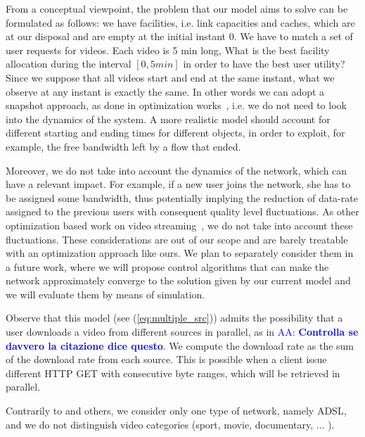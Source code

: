 \documentclass[10pt, journal,letterpaper]{IEEEtran}
\newcommand{\AAra}[1]{\textcolor{blue}{AA: \bf #1}}
\newcommand{\eqR}[1]{(\ref{eq:#1})}
\begin{document}
From a conceptual viewpoint, the problem that our model aims to solve can be formulated as follows: we have facilities, i.e. link capacities and caches, which are at our disposal and are empty at the initial instant $0$. We have to match a set of user requests for videos. Each video is 5 min long, What is the best facility allocation during the interval $[0,5 min]$ in order to have the best user utility? Since we suppose that all videos start and end at the same instant, what we observe at any instant is exactly the same. In other words we can adopt a snapshot approach, as done in optimization works~\cite{Toni2014,Zhang2013}, i.e. we do not need to look into the dynamics of the system. A more realistic model should account for different starting and ending times for different objects, in order to exploit, for example, the free bandwidth left by a flow that ended.

Moreover, we do not take into account the dynamics of the network, which can have a relevant impact. For example, if a new user joins the network, she has to be assigned some bandwidth, thus potentially implying the reduction of data-rate assigned to the previous users with consequent quality level fluctuations. As other optimization based work on video streaming~\cite{Toni2014}, we do not take into account these fluctuations. These considerations are out of our scope and are barely treatable with an optimization approach like ours. We plan to separately consider them in a future work, where we will propose control algorithms that can make the network approximately converge to the solution given by our current model and we will evaluate them by means of simulation.

Observe that this model (see \eqR{multiple_src}) admits the possibility that a user downloads a video from different sources in parallel, as in \cite{Liu2012b} \AAra{Controlla se davvero la citazione dice questo}. We compute the download rate as the sum of the download rate from each source. This is possible when a client issue different HTTP GET with consecutive byte ranges, which will be retrieved in parallel.

Contrarily to \cite{Toni2014} and others, we consider only one type of network, namely ADSL, and we do not distinguish video categories (sport, movie, documentary, ... ).




\end{document}
